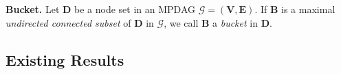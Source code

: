 \documentclass{article} %
\begin{document}
\textbf{Bucket.} Let $\mathbf{D}$ be a node set in an MPDAG $\mathcal{G}=(\mathbf{V}, \mathbf{E})$. If $\mathbf{B}$ is a maximal \textit{undirected connected subset} of $\mathbf{D}$ in $\mathcal{G}$, we call $\mathbf{B}$ a \textit{bucket} in $\mathbf{D}$.







\subsection{Existing Results}
\end{document}
